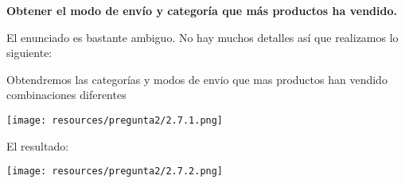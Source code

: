 \textbf{Obtener el modo de envío y categoría que más productos ha vendido.}

El enunciado es bastante ambiguo. No hay muchos detalles así que realizamos lo siguiente:

Obtendremos las categorías y modos de envio que mas productos han vendido combinaciones diferentes

\begin{center}
    \texttt{[image: resources/pregunta2/2.7.1.png]} \\
\end{center}
El resultado:
\begin{center}
    \texttt{[image: resources/pregunta2/2.7.2.png]} \\
\end{center}